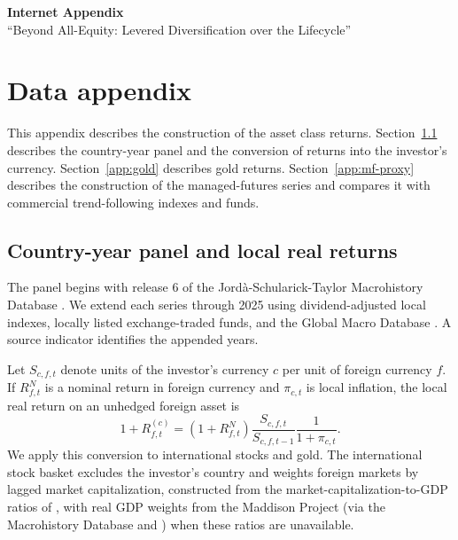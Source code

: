 \onehalfspacing
\begin{center}
{\large\bfseries Internet Appendix}\\[6pt]
``Beyond All-Equity: Levered Diversification over the Lifecycle''
\end{center}
\bigskip

\setcounter{section}{0}
\renewcommand{\thesection}{\Alph{section}}
\renewcommand{\thetable}{\thesection.\Roman{table}}
\renewcommand{\thefigure}{\thesection.\arabic{figure}}
\renewcommand{\theequation}{\thesection.\arabic{equation}}
\renewcommand{\theHsection}{IA.\Alph{section}}
\renewcommand{\theHtable}{IA.\thesection.\Roman{table}}
\renewcommand{\theHfigure}{IA.\thesection.\arabic{figure}}
\renewcommand{\theHequation}{IA.\thesection.\arabic{equation}}

\section{Data appendix}
\label{app:data-reconstruction}

This appendix describes the construction of the asset class returns. Section~\ref{app:panel} describes
the country-year panel and the conversion of returns into the investor's currency.
Section~\ref{app:gold} describes gold returns. Section~\ref{app:mf-proxy} describes the construction of
the managed-futures series and compares it with commercial trend-following indexes and funds.

\subsection{Country-year panel and local real returns}
\label{app:panel}\label{app:returns}

The panel begins with release 6 of the Jord\`a-Schularick-Taylor Macrohistory Database
\citep{MacrohistoryDB,JordaEtAl2019}. We extend each series through 2025 using dividend-adjusted local
indexes, locally listed exchange-traded funds, and the Global Macro Database
\citep{MullerXuLehbibChen2025}. A source indicator identifies the appended years.

Let $S_{c,f,t}$ denote units of the investor's currency $c$ per unit of foreign currency $f$. If
$R^{N}_{f,t}$ is a nominal return in foreign currency and $\pi_{c,t}$ is local inflation, the local real
return on an unhedged foreign asset is
\begin{equation}
  1+R^{(c)}_{f,t}=(1+R^{N}_{f,t})\frac{S_{c,f,t}}{S_{c,f,t-1}}\frac{1}{1+\pi_{c,t}}.
  \label{eq:conversion}
\end{equation}
We apply this conversion to international stocks and gold. The international stock basket excludes the
investor's country and weights foreign markets by lagged market capitalization, constructed from the
market-capitalization-to-GDP ratios of \citet{KuvshinovZimmermann2022}, with real GDP weights from the
Maddison Project (via the Macrohistory Database and \citealt{MullerXuLehbibChen2025}) when these ratios
are unavailable.

